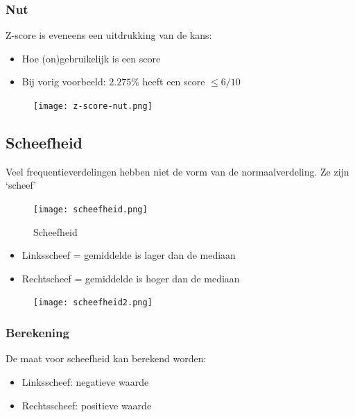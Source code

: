 \documentclass{article}
\begin{document}
\subsubsection{Nut}

Z-score is eveneens een uitdrukking van de kans:

\begin{itemize}
    \item Hoe (on)gebruikelijk is een score
    \item Bij vorig voorbeeld: $2.275\%$ heeft een score $\leq 6/10$
\end{itemize}

\begin{figure}[H]
    \centering
    \texttt{[image: z-score-nut.png]}
\end{figure}

\subsection{Scheefheid}

Veel frequentieverdelingen hebben niet de vorm van de normaalverdeling. Ze zijn `scheef'

\begin{figure}[H]
    \centering
    \texttt{[image: scheefheid.png]}
    \caption{Scheefheid}
\end{figure}

\begin{itemize}
    \item Linksscheef = gemiddelde is lager dan de mediaan
    \item Rechtscheef = gemiddelde is hoger dan de mediaan
\end{itemize}

\begin{figure}[H]
    \centering
    \texttt{[image: scheefheid2.png]}
\end{figure}

\subsubsection{Berekening}

De maat voor scheefheid kan berekend worden:

\begin{itemize}
    \item Linksscheef: negatieve waarde
    \item Rechtsscheef: positieve waarde
\end{itemize}
\end{document}
